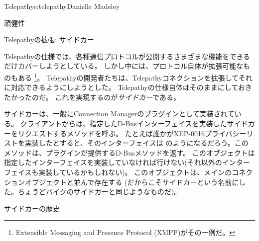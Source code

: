 \begin{aosachapter}{Telepathy}{s:telepathy}{Danielle Madeley}
\begin{aosasect1}{頑健性}
\begin{aosaitemize}
\end{aosaitemize}

\end{aosasect1}

\begin{aosasect1}{Telepathyの拡張: サイドカー}

Telepathyの仕様では、各種通信プロトコルが公開するさまざまな機能をできるだけカバーしようとしている。
しかし中には、プロトコル自体が拡張可能なものもある
\footnote{Extensible Messaging and Presence Protocol (XMPP)がその一例だ。}。
Telepathyの開発者たちは、Telepathyコネクションを拡張してそれに対応できるようにしようとした。
Telepathyの仕様自体はそのままにしておきたかったのだ。
これを実現するのが\emph{サイドカー}である。

サイドカーは、一般にConnection Managerのプラグインとして実装されている。
クライアントからは、指定したD-Busインターフェイスを実装したサイドカーをリクエストするメソッドを呼ぶ。
たとえば誰かがXEP-0016プライバシーリストを実装したとすると、そのインターフェイスは
のようになるだろう。このメソッドは、プラグインが提供するD-Busメソッドを返す。
このオブジェクトは指定したインターフェイスを実装していなければ行けない(それ以外のインターフェイスも実装しているかもしれない)。
このオブジェクトは、メインのコネクションオブジェクトと並んで存在する
(だからこそサイドカーという名前にした。ちょうどバイクのサイドカーと同じようなものだ)。

\begin{aosabox}{サイドカーの歴史}


\end{aosabox}
\end{aosasect1}
\end{aosachapter}

